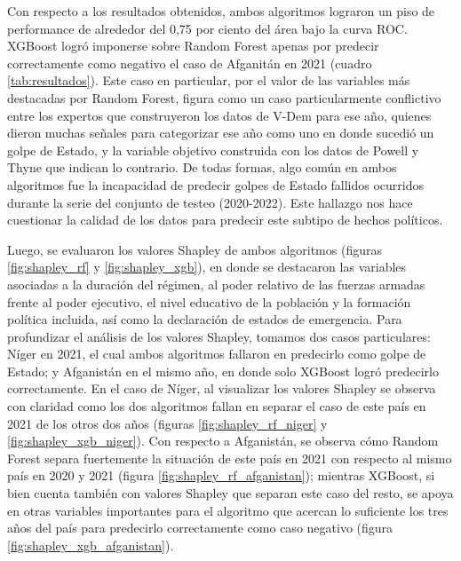 \documentclass{article}
\begin{document}
Con respecto a los resultados obtenidos, ambos algoritmos lograron un piso de performance de
alrededor del 0,75 por ciento del área bajo la curva ROC. XGBoost logró imponerse sobre Random Forest apenas
por predecir correctamente como negativo el caso de Afganitán en 2021 (cuadro \ref{tab:resultados}). 
Este caso en particular, por el valor de las variables más destacadas por Random Forest, figura como 
un caso particularmente conflictivo entre
los expertos que construyeron los datos de V-Dem para ese año, quienes dieron muchas señales para 
categorizar ese año como uno en donde sucedió un golpe de Estado, y la variable objetivo construida con los 
datos de Powell y Thyne que indican lo contrario. De todas formas, algo común en ambos algoritmos fue la 
incapacidad de predecir golpes de Estado fallidos ocurridos durante la serie del conjunto de 
testeo (2020-2022). Este hallazgo nos hace cuestionar la calidad de los datos para predecir este subtipo de 
hechos políticos.

Luego, se evaluaron los valores Shapley de ambos algoritmos (figuras \ref{fig:shapley_rf} y 
\ref{fig:shapley_xgb}), en donde se destacaron las variables asociadas
a la duración del régimen, al poder relativo de las fuerzas armadas frente al poder ejecutivo, el nivel
educativo de la población y la formación política incluida, así como la declaración de estados de emergencia.
Para profundizar el análisis de los valores Shapley, tomamos dos casos particulares: Níger en 2021, el cual
ambos algoritmos fallaron en predecirlo como golpe de Estado; y Afganistán en el mismo año, en donde solo XGBoost
logró predecirlo correctamente. En el caso de Níger, al visualizar los valores Shapley se observa con
claridad como los dos algoritmos fallan en separar el caso de este país en 2021 de los otros dos años
(figuras \ref{fig:shapley_rf_niger} y \ref{fig:shapley_xgb_niger}). Con
respecto a Afganistán, se observa cómo Random Forest separa fuertemente la situación de este país en 2021
con respecto al mismo país en 2020 y 2021 (figura \ref{fig:shapley_rf_afganistan}); mientras XGBoost, si 
bien cuenta también con valores Shapley que separan este caso del resto, se apoya en otras variables 
importantes para el algoritmo que acercan lo suficiente los tres años del país para predecirlo 
correctamente como caso negativo (figura \ref{fig:shapley_xgb_afganistan}).
\end{document}
